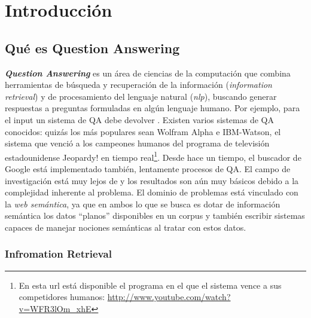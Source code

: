 
\chapter{Introducción}
\label{chap:intro}


\section{Qué es Question Answering}
\textbf{\textit{Question Answering}} es un área de ciencias de la computación que combina herramientas de búsqueda y recuperación
de la información (\textit{information retrieval}) y de procesamiento del lenguaje natural (\textit{nlp}), buscando
generar respuestas a preguntas formuladas en algún lenguaje humano.
Por ejemplo, para el input \textit{} un sistema de QA debe devolver . 
Existen varios sistemas de QA conocidos: quizás los más populares sean Wolfram Alpha e IBM-Watson, el sistema que venció a los campeones humanos del 
programa de televisión estadounidense Jeopardy! en tiempo real\footnote{En esta url está disponible el programa en el que el sistema vence a sus competidores humanos: \url{http://www.youtube.com/watch?v=WFR3lOm_xhE}}. Desde hace un tiempo, el buscador de Google está implementado también, lentamente
procesos de QA. El campo de investigación está muy lejos de  y los resultados son aún muy básicos debido a la complejidad inherente al problema. 
El dominio de problemas está  vinculado con la \textit{web semántica}, ya que en ambos lo que se busca es dotar de
información semántica los datos {\textquotedblleft}planos{\textquotedblright} disponibles en un corpus y
también escribir sistemas capaces de manejar nociones semánticas al tratar con estos datos. 


\subsection{Infromation Retrieval}
\label{sec:information-retrieval}

\bigskip

